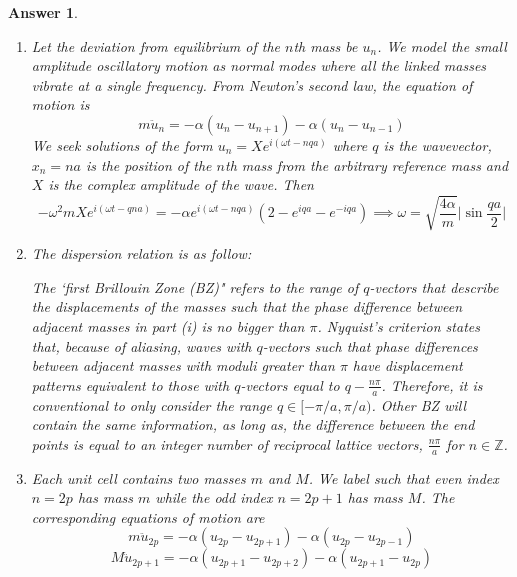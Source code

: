 \documentclass[a4paper]{article}
\newtheorem{ans}{Answer}[subsection]
\theoremstyle{new}
\begin{document}
\begin{ans}\leavevmode
\begin{enumerate}[label=(\roman*)]
\item Let the deviation from equilibrium of the $n$th mass be $u_n$. We model the small amplitude oscillatory motion as normal modes where all the linked masses vibrate at a single frequency. From Newton's second law, the equation of motion is
$$m\ddot{u}_n=-\alpha(u_n-u_{n+1})-\alpha(u_n-u_{n-1})$$
We seek solutions of the form $u_n=Xe^{i(\omega t-nqa)}$ where $q$ is the wavevector, $x_n=na$ is the position of the $n$th mass from the arbitrary reference mass and $X$ is the complex amplitude of the wave. Then
$$-\omega^2mXe^{i(\omega t-qna)}=-\alpha e^{i(\omega t-nqa)}(2-e^{iqa}-e^{-iqa})\implies\omega=\sqrt{\frac{4\alpha}{m}}\bigg|\sin\frac{qa}{2}\bigg|$$
\item The dispersion relation is as follow:
\begin{center}
\end{center}
The `first Brillouin Zone (BZ)" refers to the range of $q$-vectors that describe the displacements of the masses such that the phase difference between adjacent masses in part (i) is no bigger than $\pi$. Nyquist's criterion states that, because of aliasing, waves with $q$-vectors such that phase differences between adjacent masses with moduli greater than $\pi$ have displacement patterns equivalent to those with $q$-vectors equal to $q-\frac{n\pi}{a}$. Therefore, it is conventional to only consider the range $q\in[-\pi/a,\pi/a)$. Other BZ will contain the same information, as long as, the difference between the end points is equal to an integer number of reciprocal lattice vectors, $\frac{n\pi}{a}$ for $n\in\mathbb{Z}$. 
\item Each unit cell contains two masses $m$ and $M$. We label such that even index $n=2p$ has mass $m$ while the odd index $n=2p+1$ has mass $M$. The corresponding equations of motion are
$$m\ddot{u}_{2p}=-\alpha(u_{2p}-u_{2p+1})-\alpha(u_{2p}-u_{2p-1})$$
$$M\ddot{u}_{2p+1}=-\alpha(u_{2p+1}-u_{2p+2})-\alpha(u_{2p+1}-u_{2p})$$

\end{enumerate}
\end{ans}
\end{document}
